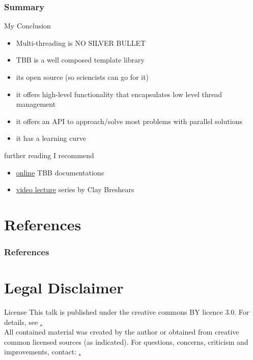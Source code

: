 \documentclass[9pt,pdftex]{beamer}
\begin{document}
\begin{frame}
  \frametitle{Summary}
  \vfill
  \begin{block}{My Conclusion}
    \begin{itemize}
    \item Multi-threading is NO SILVER BULLET
    \item TBB is a well composed template library
    \item its open source (so sciencists can go for it)
    \item it offers high-level functionality that encapsulates low level thread management
    \item it offers an API to approach/solve most problems with parallel solutions
    \item it has a learning curve
    \end{itemize}
  \end{block}

  \vfill
  \begin{block}{further reading I recommend}
    \begin{itemize}
    \item \href{http://threadingbuildingblocks.org/documentation.php}{online} TBB documentations
    \item \href{http://www.dailymotion.com/playlist/x1pc0m_Intel_Academic_EMEA_intro-to-parallel-programming/1\#video=xksoje}{video lecture} series by Clay Breshears
    \end{itemize}
  \end{block}
\end{frame}

\section{References}
\scriptsize
\begin{frame}
  \frametitle{References}
   
  
\end{frame}

\section{Legal Disclaimer}
\begin{frame}
  \vfill
  \begin{block}{License}
    This talk is published under the creative commons BY licence 3.0. For details, see \href{http://creativecommons.org/licenses/}.\\
    All contained material was created by the author or obtained from creative common licensed sources (as indicated). For questions, concerns, criticism and improvements, contact: \href{mailto:Peter.Steinbach@tu-dresden.de}.
  \end{block}
  \vfill
\end{frame}
\end{document}
